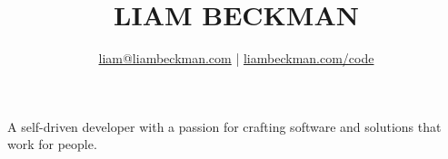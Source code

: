 \title{\textcolor{my-red}{LIAM BECKMAN}}
\author{
    \textcolor{my-blue}{\href{mailto:liam@liambeckman.com}{liam@liambeckman.com}} | \textcolor{my-blue}{\href{https://liambeckman.com/code}{liambeckman.com/code}}
}


\date{\vspace{-2em}}



\maketitle

\begin{center}
A self-driven developer with a passion for crafting software and solutions that work for people.\\
\end{center}

